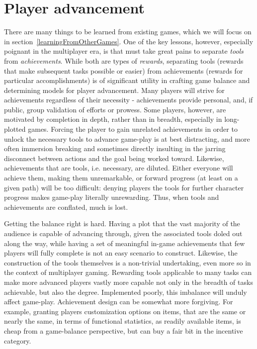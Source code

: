 \section{Player advancement}

There are many things to be learned from existing games, which we will
focus on in section~\ref{learningFromOtherGames}. One of the key
lessons, however, especially poignant in the multiplayer era, is that
must take great pains to separate {\em tools} from {\em
achievements}. While both are types of {\em rewards}, separating tools
(rewards that make subsequent tasks possible or easier) from
achievements (rewards for particular accomplishments) is of
significant utility in crafting game balance and determining models
for player advancement. Many players will strive for achievements
regardless of their necessity - achievements provide personal, and, if
public, group validation of efforts or prowess. Some players, however,
are motivated by completion in depth, rather than in breadth,
especially in long-plotted games. Forcing the player to gain unrelated
achievements in order to unlock the necessary tools to advance
game-play is at best distracting, and more often immersion breaking and
sometimes directly insulting in the jarring disconnect between actions
and the goal being worked toward. Likewise, achievements that are
tools, i.e.  necessary, are diluted. Either everyone will achieve
them, making them unremarkable, or forward progress (at least on a
given path) will be too difficult: denying players the tools for
further character progress makes game-play literally unrewarding.
Thus, when tools and achievements are conflated, much is lost.

Getting the balance right is hard. Having a plot that the vast
majority of the audience is capable of advancing through, given the
associated tools doled out along the way, while having a set of
meaningful in-game achievements that few players will fully complete
is not an easy scenario to construct. Likewise, the construction of
the tools themselves is a non-trivial undertaking, even more so in the
context of multiplayer gaming. Rewarding tools applicable to many
tasks can make more advanced players vastly more capable not only in
the breadth of tasks achievable, but also the degree. Implemented
poorly, this imbalance will unduly affect game-play. Achievement design
can be somewhat more forgiving. For example, granting players
customization options on items, that are the same or nearly the same,
in terms of functional statistics, as readily available items, is
cheap from a game-balance perspective, but can buy a fair bit in the
incentive category.

